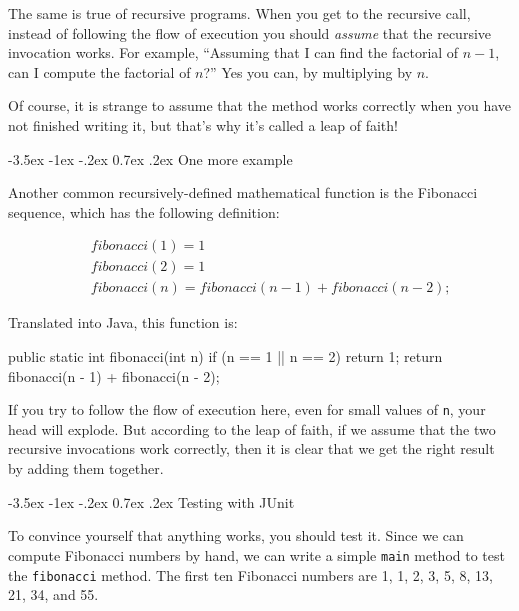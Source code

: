 \documentclass[12pt]{book}
\makeatletter
\theoremstyle{exercise}
\newcommand{\java}[1]{\verb"#1"}
\renewcommand{\section}{\@startsection{section}{1}{\z@}%
    {-3.5ex \@plus -1ex \@minus -.2ex}%
    {0.7ex \@plus.2ex}%
    {\normalfont\Large\bfseries}}
\newcommand{\java}[1]{\lstinline{#1}} %
\makeatother
\begin{document}
The same is true of recursive programs.
When you get to the recursive call, instead of following the flow of execution you should {\em assume} that the recursive invocation works.
For example, ``Assuming that I can find the factorial of $n-1$, can I compute the factorial of $n$?''
Yes you can, by multiplying by $n$.

Of course, it is strange to assume that the method works correctly when you have not finished writing it, but that's why it's called a leap of faith!


\section{One more example}
\label{fibonacci}


Another common recursively-defined mathematical function is the Fibonacci sequence, which has the following definition:

\vspace{-1ex}
\begin{eqnarray*}
&& fibonacci(1) = 1 \\
&& fibonacci(2) = 1 \\
&& fibonacci(n) = fibonacci(n-1) + fibonacci(n-2);
\end{eqnarray*}
\vspace{-1ex}

Translated into Java, this function is:

\begin{code}
    public static int fibonacci(int n) {
        if (n == 1 || n == 2) {
            return 1;
        }
        return fibonacci(n - 1) + fibonacci(n - 2);
    }
\end{code}

If you try to follow the flow of execution here, even for small values of \java{n}, your head will explode.
But according to the leap of faith, if we assume that the two recursive invocations work correctly, then it is clear that we get the right result by adding them together.


\section{Testing with JUnit}
\label{JUnit}

To convince yourself that anything works, you should test it.
Since we can compute Fibonacci numbers by hand, we can write a simple \java{main} method to test the \java{fibonacci} method.
The first ten Fibonacci numbers are 1, 1, 2, 3, 5, 8, 13, 21, 34, and 55.
\end{document}
